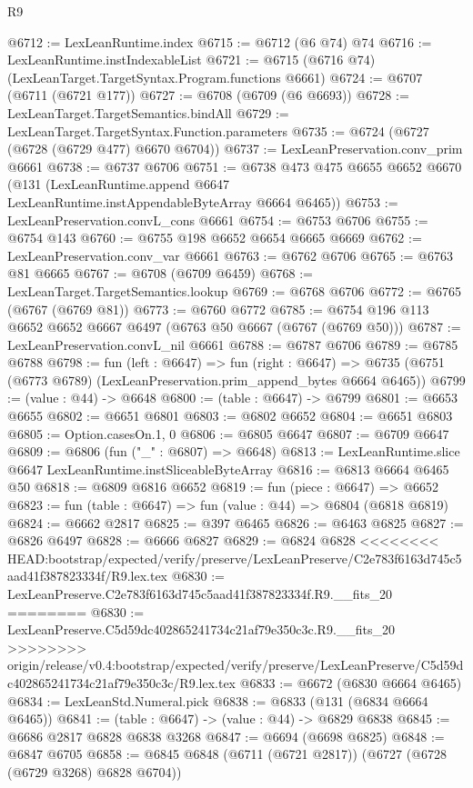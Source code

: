 \begin{lexlean}{R9}
\begin{coremodule}
{{{{{{{{{{{{{{{{{{{{{{{{{{{{{{{{{{{{{{{{{{{{{{{{{{{{{{{{{{{{{{{{{{{{{{{{{{{{{{{{{{{{@6712 := LexLeanRuntime.index
@6715 := @6712 (@6 @74) @74
@6716 := LexLeanRuntime.instIndexableList
@6721 := @6715 (@6716 @74) (LexLeanTarget.TargetSyntax.Program.functions @6661)
@6724 := @6707 (@6711 (@6721 @177))
@6727 := @6708 (@6709 (@6 @6693))
@6728 := LexLeanTarget.TargetSemantics.bindAll
@6729 := LexLeanTarget.TargetSyntax.Function.parameters
@6735 := @6724 (@6727 (@6728 (@6729 @477) @6670 @6704))
@6737 := LexLeanPreservation.conv_prim @6661
@6738 := @6737 @6706
@6751 := @6738
    @473
    @475
    @6655
    @6652
    @6670
    (@131 (LexLeanRuntime.append @6647 LexLeanRuntime.instAppendableByteArray @6664 @6465))
@6753 := LexLeanPreservation.convL_cons @6661
@6754 := @6753 @6706
@6755 := @6754 @143
@6760 := @6755 @198 @6652 @6654 @6665 @6669
@6762 := LexLeanPreservation.conv_var @6661
@6763 := @6762 @6706
@6765 := @6763 @81 @6665
@6767 := @6708 (@6709 @6459)
@6768 := LexLeanTarget.TargetSemantics.lookup
@6769 := @6768 @6706
@6772 := @6765 (@6767 (@6769 @81))
@6773 := @6760 @6772
@6785 := @6754 @196 @113 @6652 @6652 @6667 @6497 (@6763 @50 @6667 (@6767 (@6769 @50)))
@6787 := LexLeanPreservation.convL_nil @6661
@6788 := @6787 @6706
@6789 := @6785 @6788
@6798 := fun (left : @6647) =>
  fun (right : @6647) =>
  @6735 (@6751 (@6773 @6789) (LexLeanPreservation.prim_append_bytes @6664 @6465))
@6799 := (value : @44) -> @6648
@6800 := (table : @6647) -> @6799
@6801 := @6653 @6655
@6802 := @6651 @6801
@6803 := @6802 @6652
@6804 := @6651 @6803
@6805 := Option.casesOn.{1, 0}
@6806 := @6805 @6647
@6807 := @6709 @6647
@6809 := @6806 (fun ("_" : @6807) => @6648)
@6813 := LexLeanRuntime.slice @6647 LexLeanRuntime.instSliceableByteArray
@6816 := @6813 @6664 @6465 @50
@6818 := @6809 @6816 @6652
@6819 := fun (piece : @6647) => @6652
@6823 := fun (table : @6647) => fun (value : @44) => @6804 (@6818 @6819)
@6824 := @6662 @2817
@6825 := @397 @6465
@6826 := @6463 @6825
@6827 := @6826 @6497
@6828 := @6666 @6827
@6829 := @6824 @6828
<<<<<<<< HEAD:bootstrap/expected/verify/preserve/LexLeanPreserve/C2e783f6163d745c5aad41f387823334f/R9.lex.tex
@6830 := LexLeanPreserve.C2e783f6163d745c5aad41f387823334f.R9.__fits_20
========
@6830 := LexLeanPreserve.C5d59dc402865241734c21af79e350c3c.R9.__fits_20
>>>>>>>> origin/release/v0.4:bootstrap/expected/verify/preserve/LexLeanPreserve/C5d59dc402865241734c21af79e350c3c/R9.lex.tex
@6833 := @6672 (@6830 @6664 @6465)
@6834 := LexLeanStd.Numeral.pick
@6838 := @6833 (@131 (@6834 @6664 @6465))
@6841 := (table : @6647) -> (value : @44) -> @6829 @6838
@6845 := @6686 @2817 @6828 @6838 @3268
@6847 := @6694 (@6698 @6825)
@6848 := @6847 @6705
@6858 := @6845 @6848 (@6711 (@6721 @2817)) (@6727 (@6728 (@6729 @3268) @6828 @6704))
}}}}}}}}}}}}}}}}}}}}}}}}}}}}}}}}}}}}}}}}}}}}}}}}}}}}}}}}}}}}}}}}}}}}}}}}}}}}}}}}}}}}
\end{coremodule}
\end{lexlean}
